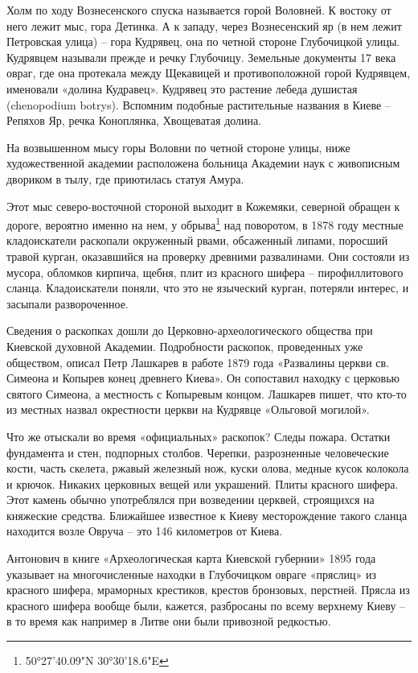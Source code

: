 Холм по ходу Вознесенского спуска называется горой Воловней. К востоку от него лежит мыс, гора Детинка. А к западу, через Вознесенский яр (в нем лежит Петровская улица) – гора Кудрявец, она по четной стороне Глубочицкой улицы. Кудрявцем называли прежде и речку Глубочицу. Земельные документы 17 века овраг, где она протекала между Щекавицей и противоположной горой Кудрявцем, именовали «долина Кудравец». Кудрявец это растение лебеда душистая (chenopodium botrys). Вспомним подобные растительные названия в Киеве – Репяхов Яр, речка Коноплянка, Хвощеватая долина.

На возвышенном мысу горы Воловни по четной стороне улицы, ниже художественной академии расположена больница Академии наук с живописным двориком в тылу, где приютилась статуя Амура.

Этот мыс северо-восточной стороной выходит в Кожемяки, северной обращен к дороге, вероятно именно на нем, у обрыва\footnote{50°27'40.09"N 30°30'18.6"E} над поворотом, в 1878 году местные кладоискатели раскопали окруженный рвами, обсаженный липами, поросший травой курган, оказавшийся на проверку древними развалинами. Они состояли из мусора, обломков кирпича, щебня, плит из красного шифера – пирофиллитового сланца. Кладоискатели поняли, что это не языческий курган, потеряли интерес, и засыпали развороченное.

Сведения о раскопках дошли до Церковно-археологи\-ческого общества при Киевской духовной Академии. Подробности раскопок, проведенных уже обществом, описал Петр Лашкарев в работе 1879 года «Развалины церкви св. Симеона и Копырев конец древнего Киева». Он сопоставил находку с церковью святого Симеона, а местность с Копыревым концом. Лашкарев пишет, что кто-то из местных назвал окрестности церкви на Кудрявце «Ольговой могилой».

Что же отыскали во время «официальных» раскопок? Следы пожара. Остатки фундамента и стен, подпорных столбов. Черепки, разрозненные человеческие кости, часть скелета, ржавый железный нож, куски олова, медные кусок колокола и крючок. Никаких церковных вещей или украшений. Плиты красного шифера. Этот камень обычно употреблялся при возведении церквей, строящихся на княжеские средства. Ближайшее известное к Киеву месторождение такого сланца находится возле Овруча – это 146 километров от Киева.

Антонович в книге «Археологическая карта Киевской губернии» 1895 года указывает на многочисленные находки в Глубочицком овраге «пряслиц» из красного шифера, мраморных крестиков, крестов бронзовых, перстней. Прясла из красного шифера вообще были, кажется, разбросаны по всему верхнему Киеву – в то время как например в Литве они были привозной редкостью.

